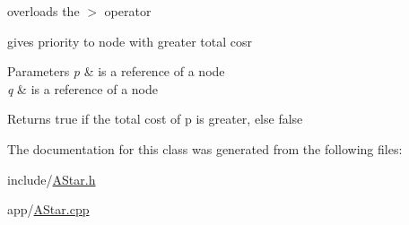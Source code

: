 overloads the \textquotesingle{}$>$\textquotesingle{} operator 

gives priority to node with greater total cosr


\begin{DoxyParams}{Parameters}
{\em p} & is a reference of a node \\
\hline
{\em q} & is a reference of a node\\
\hline
\end{DoxyParams}
\begin{DoxyReturn}{Returns}
true if the total cost of p is greater, else false 
\end{DoxyReturn}


The documentation for this class was generated from the following files\+:\begin{DoxyCompactItemize}
\item 
include/\hyperlink{AStar_8h}{A\+Star.\+h}\item 
app/\hyperlink{AStar_8cpp}{A\+Star.\+cpp}\end{DoxyCompactItemize}
